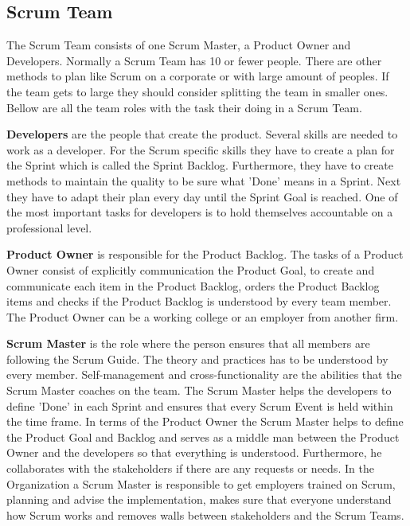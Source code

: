 \subsection{Scrum Team}
The Scrum Team consists of one Scrum Master, a Product Owner and Developers. Normally a Scrum Team has 10 or fewer people. There are other methods to plan like Scrum on a corporate or with large amount of peoples. If the team gets to large they should consider splitting the team in smaller ones. Bellow are all the team roles with the task their doing in a Scrum Team. \cite{scrum_guide}

\textbf{Developers} are the people that create the product. Several skills are needed to work as a developer. For the Scrum specific skills they have to create a plan for the Sprint which is called the Sprint Backlog. Furthermore, they have to create methods to maintain the quality to be sure what 'Done' means in a Sprint. Next they have to adapt their plan every day until the Sprint Goal is reached. One of the most important tasks for developers is to hold themselves accountable on a professional level. \cite{scrum_guide}

\textbf{Product Owner} is responsible for the Product Backlog. The tasks of a Product Owner consist of explicitly communication the Product Goal, to create and communicate each item in the Product Backlog, orders the Product Backlog items and checks if the Product Backlog is understood by every team member. \cite{scrum_guide} The Product Owner can be a working college or an employer from another firm.

\textbf{Scrum Master} is the role where the person ensures that all members are following the Scrum Guide. The theory and practices has to be understood by every member. Self-management and cross-functionality are the abilities that the Scrum Master coaches on the team. The Scrum Master helps the developers to define 'Done' in each Sprint and ensures that every Scrum Event is held within the time frame. In terms of the Product Owner the Scrum Master helps to define the Product Goal and Backlog and serves as a middle man between the Product Owner and the developers so that everything is understood. Furthermore, he collaborates with the stakeholders if there are any requests or needs. In the Organization a Scrum Master is responsible to get employers trained on Scrum, planning and advise the implementation, makes sure that everyone understand how Scrum works and removes walls between stakeholders and the Scrum Teams. \cite{scrum_guide}

